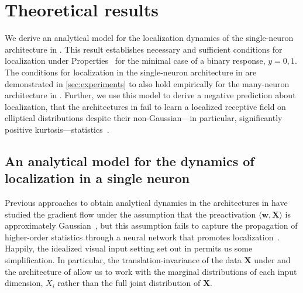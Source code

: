 \section{Theoretical results}
\label{sec:theory}

We derive an analytical model for the localization dynamics of the single-neuron architecture in .
This result establishes necessary and sufficient conditions for localization under Properties~ for the minimal case of a binary response, \ie $y = 0,1$.
The conditions for localization in the single-neuron architecture in  are demonstrated in \cref{sec:experiments} to also hold empirically for the many-neuron architecture in .
Further, we use this model to derive a negative prediction about localization, that the architectures in  fail to learn a localized receptive field on elliptical distributions
despite their non-Gaussian---in particular, significantly positive kurtosis---statistics~\parencite[\cf positive kurtosis as an objective or diagnostic for localization,][]{hyvarinen2000independent,ingrosso2022data}.

\subsection{An analytical model for the dynamics of localization in a single neuron}

Previous approaches to obtain analytical dynamics in the architectures in 
have studied the gradient flow under the assumption that the preactivation $\langle \mathbf{w}, \mathbf{X} \rangle$ is approximately Gaussian~\parencite{goldt2020modelling,gerace2020generalisation,goldt2022gaussian}, but this assumption fails to capture the propagation of higher-order statistics through a neural network that promotes localization~\cite{ingrosso2022data}.
Happily, the idealized visual input setting set out in  permits us some simplification.
In particular, 
the translation-invariance of the data $\mathbf{X}$ under  and 
the architecture of 
allow us to work with the marginal distributions of each input dimension, $X_i$ rather than the full joint distribution of $\mathbf{X}$.

